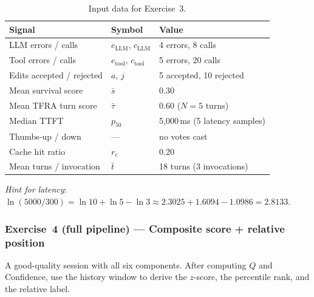 \documentclass[11pt,a4paper]{article}
\begin{document}
\begin{table}[h!]
\centering
\caption{Input data for Exercise~3.}
\label{tab:ex3-input}
\begin{tabular}{@{}lll@{}}
\toprule
Signal & Symbol & Value \\
\midrule
LLM errors / calls & $e_{\text{LLM}},\,c_{\text{LLM}}$ & 4 errors, 8 calls \\
Tool errors / calls & $e_{\text{tool}},\,c_{\text{tool}}$ & 5 errors, 20 calls \\
Edits accepted / rejected & $a,\,j$ & 5 accepted, 10 rejected \\
Mean survival score & $\bar{s}$ & 0.30 \\
Mean TFRA turn score & $\bar{\tau}$ & 0.60 \hfill($N=5$ turns) \\
Median TTFT & $p_{50}$ & 5{,}000\,ms \hfill(5 latency samples) \\
Thumbs-up / down & --- & no votes cast \\
Cache hit ratio & $r_c$ & 0.20 \\
Mean turns / invocation & $\bar{t}$ & 18 turns \hfill(3 invocations) \\
\bottomrule
\end{tabular}
\end{table}

\noindent\emph{Hint for latency}:
$\ln(5000/300)=\ln10+\ln5-\ln3
\approx 2.3025+1.6094-1.0986=2.8133$.

\subsubsection*{Exercise~4 \textmd{(full pipeline)} --- Composite score + relative position}
\label{app:ex4}

A good-quality session with all six components.  After computing $Q$ and
Confidence, use the history window to derive the $z$-score, the percentile
rank, and the relative label.
\end{document}
